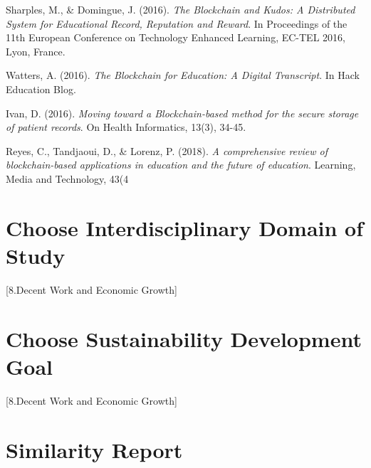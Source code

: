\documentclass[12pt]{report}
\begin{document}
\begin{thebibliography}{9}
Sharples, M., \& Domingue, J. (2016). \textit{The Blockchain and Kudos: A Distributed System for Educational Record, Reputation and Reward}. In Proceedings of the 11th European Conference on Technology Enhanced Learning, EC-TEL 2016, Lyon, France.

Watters, A. (2016). \textit{The Blockchain for Education: A Digital Transcript}. In Hack Education Blog.

Ivan, D. (2016). \textit{Moving toward a Blockchain-based method for the secure storage of patient records}. On Health Informatics, 13(3), 34-45.

Reyes, C., Tandjaoui, D., \& Lorenz, P. (2018). \textit{A comprehensive review of blockchain-based applications in education and the future of education}. Learning, Media and Technology, 43(4

\end{thebibliography}




\section{Choose Interdisciplinary Domain of Study}
[8.Decent Work and Economic Growth]

\section{Choose Sustainability Development Goal}
[8.Decent Work and Economic Growth]

\section{Similarity Report}
\end{document}
